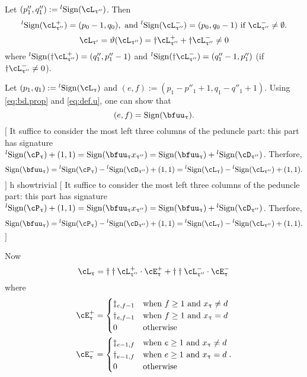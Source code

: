 \documentclass[12pt,a4paper]{amsart}
\newcommand{\trivial}[2][]{\if\relax\detokenize{#1}\relax
  {%
      \color{orange} \vspace{0em} $[$  #2 $]$
      \color{black}
  }
  \else
\ifx#1h
\ifcsname showtrivial\endcsname
{%
    \color{orange} \vspace{0em}  $[$ #2 $]$
    \color{black}
}
\fi
\else {\red Wrong argument!} \fi
\fi
}
\numberwithin{equation}{section}
\theoremstyle{remark}
\def\lsign{{}^l\mathrm{Sign}}
\def\ssign{\mathrm{Sign}}
\def\drc{\mathrm{DRC}}
\def\cOp{\cO^{\prime}}
\def\pcL{\cL^+}
\def\ncL{\cL^-}
\def\pcE{\cE^+}
\def\ncE{\cE^-}
\def\uptaup{\uptau^{\prime}}
\def\uptaupp{\uptau^{\prime\prime}}
\begin{document}


Let $(p''_{1},q''_{1}) := \lsign(\cL_{\uptaupp})$.
Then
\begin{equation}\label{eq:lsign.1}
\lsign(\pcL_{\uptaupp}) = (p_{0}-1,q_{0}), \text{ and }
\lsign(\ncL_{\uptaupp})=(p_{0},q_{0}-1) \text{ if } \ncL_{\uptaupp}\neq \emptyset.
\end{equation}
\begin{equation}\label{eq:LS.taup}
  \cL_{\uptaup} = \vartheta(\cL_{\uptaupp}) = \dagger \pcL_{\uptaupp} + \dagger \ncL_{\uptaupp} \neq 0
\end{equation}
where
$\lsign(\dagger\pcL_{\uptaupp}) = (q''_{1}, p''_{1}-1)$ and
$\lsign(\dagger\ncL_{\uptaupp})=(q''_{1}-1,p''_{1})$ (if
$\dagger\ncL_{\uptaupp}\neq 0$).

Let $(p_{1},q_{1}) := \lsign(\cL_{\uptau})$ and
$(e,f):=(p_{1}-p''_{1}+1, q_{1}-q''_{1}+1)$. Using \eqref{eq:bd.prop} and
\eqref{eq:def.u}, one can show that
\[
  (e,f)=\ssign(\bfuu_{\uptau}).
\]
\trivial[]{ It suffice to consider the most left three columns of the peduncle
  part: this part has signature
  $\lsign(\cP_{\uptau}) +(1,1) = \ssign(\bfuu_{\uptau}x_{\uptaupp})= \ssign(\bfuu_{\uptau})+\lsign(\cD_{\uptaupp})$.
  Therfore,
  \[\ssign(\bfuu_{\uptau}) = \lsign(\cP_{\uptau})-\lsign(\cD_{\uptaupp})
  + (1,1) = \lsign(\cL_{\uptau})-\lsign(\cL_{\uptaupp})+(1,1).
  \]
}

Now
\begin{equation}\label{eq:gd.ls}
  \cL_{\uptau} = \dagger\dagger \pcL_{\uptaupp} \cdot \pcE_{\uptau}   + \dagger\dagger \ncL_{\uptaupp}  \cdot \ncE_{\uptau}
\end{equation}
where
\[
  \begin{split}
    \pcE_{\uptau}& = \begin{cases} \ddagger_{e,f-1} & \text{when
      } f\geq 1 \text{ and } x_{\uptau}\neq d \\
      \dagger_{e,f-1} & \text{when
      } f\geq 1 \text{ and } x_{\uptau}= d \\
      0 & \text{otherwise}
    \end{cases}\\
    \ncE_{\uptau}& = \begin{cases} \ddagger_{e-1,f} & \text{when
      } e\geq 1 \text{ and } x_{\uptau}\neq d \\
      \dagger_{e-1,f} & \text{when
      } e\geq 1 \text{ and } x_{\uptau}= d \\
      0 & \text{otherwise}
    \end{cases}.\\
  \end{split}
\]
%
\end{document}
